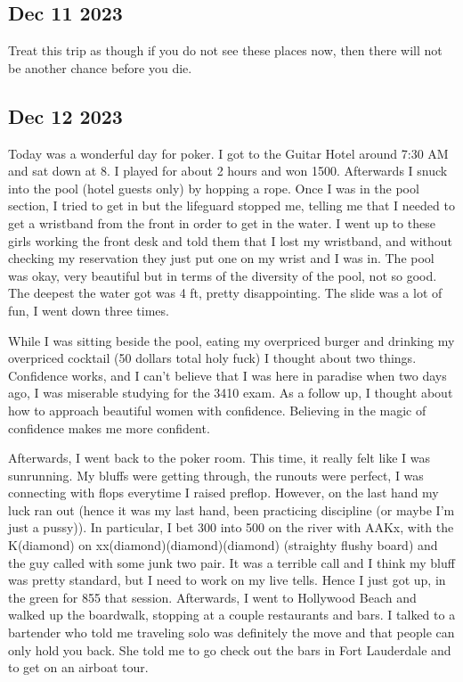 \documentclass[12pt]{article}
\begin{document}
\subsection{Dec 11 2023}
Treat this trip as though if you do not see these places now, then there will not be 
another chance before you die.
\subsection{Dec 12 2023}
Today was a wonderful day for poker. I got to the Guitar Hotel around 7:30 AM and sat down at 8.
I played for about 2 hours and won 1500. Afterwards I snuck into the pool (hotel guests only) by hopping a rope.
Once I was in the pool section, I tried to get in but the lifeguard stopped me, telling me
that I needed to get a wristband from the front in order to get in the water. I went up to these girls
working the front desk and told them that I lost my wristband, and without checking my reservation
they just put one on my wrist and I was in. The pool was okay, very beautiful but in terms of the diversity of the pool, not so good.
The deepest the water got was 4 ft, pretty disappointing. The slide was a lot of fun, I went down three times.

\hfill

While I was sitting beside the pool, eating my overpriced burger and drinking my overpriced cocktail (50 dollars total holy fuck)
I thought about two things. Confidence works, and I can't believe that I was here in paradise when
two days ago, I was miserable studying for the 3410 exam. As a follow up, I thought about how to approach beautiful women with confidence. Believing in 
the magic of confidence makes me more confident.

\hfill 

Afterwards, I went back to the poker room. This time, it really felt like I was sunrunning.
My bluffs were getting through, the runouts were perfect, I was connecting with flops everytime I raised preflop. 
However, on the last hand my luck ran out (hence it was my last hand, been practicing discipline (or maybe I'm just a pussy)).
In particular, I bet 300 into 500 on the river with AAKx, with the K(diamond) on xx(diamond)(diamond)(diamond) (straighty flushy board)
and the guy called with some junk two pair. It was a terrible call and I think my bluff was pretty standard,
but I need to work on my live tells. Hence I just got up, in the green for 855 that session. Afterwards, I went to Hollywood Beach
and walked up the boardwalk, stopping at a couple restaurants and bars. I talked to a bartender who
told me traveling solo was definitely the move and that people can only hold you back. She told me
to go check out the bars in Fort Lauderdale and to get on an airboat tour.
\end{document}
